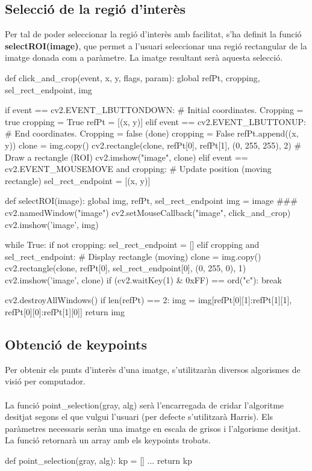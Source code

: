 	\subsection{Selecció de la regió d'interès}
		Per tal de poder seleccionar la regió d'interès amb facilitat, s'ha definit la funció \textbf{selectROI(image)}, que permet a l'usuari seleccionar una regió rectangular de la imatge donada
		com a paràmetre. La imatge resultant serà aquesta selecció.\\
		\begin{python}
def click_and_crop(event, x, y, flags, param):
	global refPt, cropping, sel_rect_endpoint, img
 
	if event == cv2.EVENT_LBUTTONDOWN:	# Initial coordinates. Cropping = true
		cropping = True
		refPt = [(x, y)] 
	elif event == cv2.EVENT_LBUTTONUP:	# End coordinates. Cropping = false (done)
		cropping = False
		refPt.append((x, y)) 
		clone = img.copy()
		cv2.rectangle(clone, refPt[0], refPt[1], (0, 255, 255), 2)	# Draw a rectangle (ROI)
		cv2.imshow("image", clone)
	elif event == cv2.EVENT_MOUSEMOVE and cropping:	# Update position (moving rectangle)
		sel_rect_endpoint = [(x, y)]

def selectROI(image):
	global img, refPt, sel_rect_endpoint
	img = image ###
	cv2.namedWindow("image")
	cv2.setMouseCallback("image", click_and_crop)
	cv2.imshow('image', img)

	while True:
		if not cropping:
			sel_rect_endpoint = []
		elif cropping and sel_rect_endpoint:	# Display rectangle (moving)
			clone = img.copy()
			cv2.rectangle(clone, refPt[0], sel_rect_endpoint[0], (0, 255, 0), 1)
			cv2.imshow('image', clone)
		if (cv2.waitKey(1) & 0xFF) == ord("c"):
			break

	cv2.destroyAllWindows()
	if len(refPt) == 2:
		img = img[refPt[0][1]:refPt[1][1], refPt[0][0]:refPt[1][0]]
	return img
		\end{python}
	\subsection{Obtenció de keypoints}
		Per obtenir els punts d'interès d'una imatge, s'utilitzaràn diversos algorismes de visió per computador.\\\\
		La funció point{\_}selection(gray, alg) serà l'encarregada de cridar l'algoritme desitjat segons el que vulgui l'usuari (per defecte s'utilitzarà Harris).
		Els paràmetres necessaris seràn una imatge en escala de grisos i l'algorisme desitjat. La funció retornarà un array amb els keypoints trobats. \\
		\begin{python}
def point_selection(gray, alg):
	kp = []
	...
	return kp
		\end{python}

